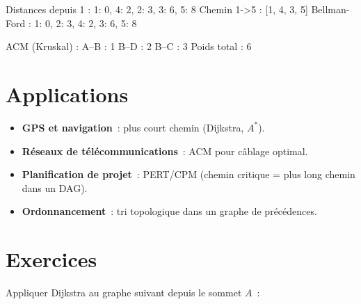 \begin{codeoutput}
Distances depuis 1 : {1: 0, 4: 2, 2: 3, 3: 6, 5: 8}
Chemin 1->5 : [1, 4, 3, 5]
Bellman-Ford : {1: 0, 2: 3, 4: 2, 3: 6, 5: 8}

ACM (Kruskal) :
  A--B : 1
  B--D : 2
  B--C : 3
Poids total : 6
\end{codeoutput}

\section{Applications}

\begin{itemize}
  \item \textbf{GPS et navigation}~: plus court chemin (Dijkstra, $A^*$).
  \item \textbf{R\'eseaux de t\'el\'ecommunications}~: ACM pour c\^ablage
        optimal.
  \item \textbf{Planification de projet}~: PERT/CPM (chemin critique = plus
        long chemin dans un DAG).
  \item \textbf{Ordonnancement}~: tri topologique dans un graphe de
        pr\'ec\'edences.
\end{itemize}

\section{Exercices}

\begin{exercice}
Appliquer Dijkstra au graphe suivant depuis le sommet $A$~:

\begin{center}
\end{center}
\end{exercice}

